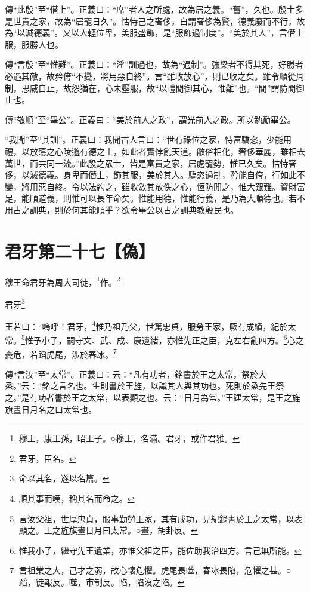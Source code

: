 {\noindent\zhuan{}\fzbyks 傳“此殷”至“僣上”。正義曰：“席”者人之所處，故為居之義。“舊”，久也。殷士多是世貴之家，故為“居寵日久”。怙恃己之奢侈，自謂奢侈為賢，德義廢而不行，故為“以滅德義”。又以人輕位卑，美服盛飾，是“服飾過制度”。“美於其人”，言僣上服，服勝人也。 \par}

{\noindent\zhuan{}\fzbyks 傳“言殷”至“惟難”。正義曰：“淫”訓過也，故為“過制”。強梁者不得其死，好勝者必遇其敵，故矜侉“不變，將用惡自終”。言“雖收放心”，則已收之矣。雖令順從周制，思威自止，故怨猶在，心未壓服，故“以禮閒御其心，惟難”也。“閒”謂防閒御止也。 \par}

{\noindent\zhuan{}\fzbyks 傳“敬順”至“畢公”。正義曰：“美於前人之政”，謂光前人之政。所以勉勵畢公。 \par}

{\noindent\shu{}\fzkt “我聞”至“其訓”。正義曰：我聞古人言曰：“世有祿位之家，恃富驕恣，少能用禮，以放蕩之心陵邈有德之士，如此者實悖亂天道。敝俗相化，奢侈華麗，雖相去萬世，而共同一流。”此殷之眾士，皆是富貴之家，居處寵勢，惟已久矣。怙恃奢侈，以滅德義。身卑而僣上，飾其服，美於其人。驕恣過制，矜能自侉，行如此不變，將用惡自終。令以法約之，雖收斂其放佚之心，恆防閒之，惟大艱難。資財富足，能順道義，則惟可以長年命矣。惟能用德，惟能行義，是乃為大順德也。若不用古之訓典，則於何其能順乎？欲令畢公以古之訓典教殷民也。 \par}

\section{君牙第二十七【偽】}


穆王命君牙為周大司徒，\footnote{穆王，康王孫，昭王子。○穆王，名滿。君牙，或作君雅。}作。\footnote{君牙，臣名。}

君牙\footnote{命以其名，遂以名篇。}

王若曰：“嗚呼！君牙，\footnote{順其事而嘆，稱其名而命之。}惟乃祖乃父，世篤忠貞，服勞王家，厥有成績，紀於太常。\footnote{言汝父祖，世厚忠貞，服事勤勞王家，其有成功，見紀錄書於王之太常，以表顯之。王之旌旗畫日月曰太常。○畫，胡卦反。}惟予小子，嗣守文、武、成、康遺緒，亦惟先正之臣，克左右亂四方。\footnote{惟我小子，繼守先王遺業，亦惟父祖之臣，能佐助我治四方。言己無所能。}心之憂危，若蹈虎尾，涉於春冰。\footnote{言祖業之大，己才之弱，故心懷危懼。虎尾畏噬，春冰畏陷，危懼之甚。○蹈，徒報反。噬，市制反。陷，陷沒之陷。}


{\noindent\zhuan{}\fzbyks 傳“言汝”至“太常”。正義曰：云：“凡有功者，銘書於王之太常，祭於大烝。”云：“銘之言名也。生則書於王旌，以識其人與其功也。死則於烝先王祭之。”是有功者書於王之太常，以表顯之也。云：“日月為常。”王建太常，是王之旌旗晝日月名之曰太常也。 \par}


